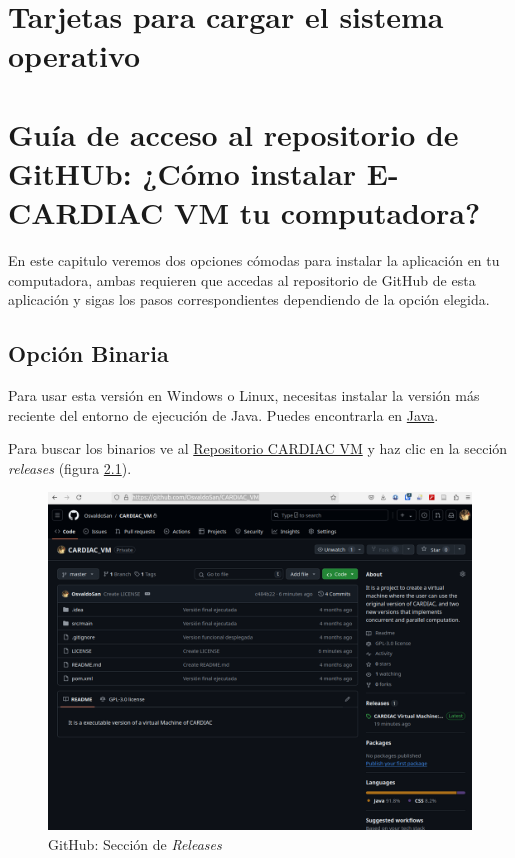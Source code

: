 \documentclass[letterpaper,12pt,oneside]{book}
\begin{document}
\chapter{Tarjetas para cargar el sistema operativo}


\chapter{Guía de acceso al repositorio de GitHUb: ¿Cómo instalar E-CARDIAC VM tu computadora?}


En este capitulo veremos dos opciones cómodas para instalar la aplicación en tu computadora, ambas requieren que accedas al repositorio
de GitHub de esta aplicación y sigas los pasos correspondientes dependiendo de la opción elegida.

\section{Opción Binaria}

Para usar esta versión en Windows o Linux, necesitas instalar la versión más reciente del entorno de ejecución de Java. Puedes encontrarla en
\href{https://www.java.com/en/}{Java}.

Para buscar los binarios ve al \href{https://github.com/OsvaldoSan/CARDIAC_VM}{Repositorio CARDIAC VM} y haz clic en la sección \textit{releases} 
(figura \ref{fig:github_relsecc}).


\begin{figure}[h]		
				\centering
				\includegraphics[scale=0.28]{media_g/realese_section.png}
				\caption{GitHub: Sección de \textit{Releases}}
				\label{fig:github_relsecc}
\end{figure}
	
\end{document}
